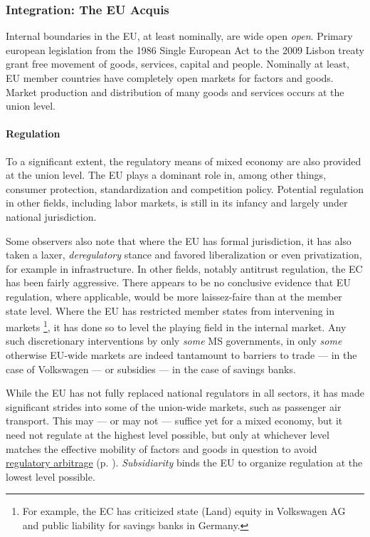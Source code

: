 \documentclass[11pt,a4paper,oneside,openright]{article}
\begin{document}
\subsubsection[Integration]{Integration: The EU Acquis} \label{sec:EU_Acquis}
Internal boundaries in the \gls{EU}, at least nominally, are wide open \emph{open}. %
Primary european legislation from the 1986 Single European Act to the 2009 Lisbon treaty grant free movement of goods, services, capital and people. 
Nominally at least, \gls{EU} member countries have completely open markets for factors and goods. 
Market production and distribution of many goods and services occurs at the union level.

\paragraph{Regulation} To a significant extent, the regulatory means of mixed economy are also provided at the union level. 
The \gls{EU} plays a dominant role in, among other things, consumer protection, standardization and competition policy. 
Potential regulation in other fields, including labor markets, is still in its infancy and largely under national jurisdiction. %

Some observers also note that where the \gls{EU} has formal jurisdiction, it has also taken a laxer, \emph{deregulatory} stance and favored liberalization or even privatization, for example in infrastructure. %
In other fields, notably antitrust regulation, the \gls{EC} has been fairly aggressive. 
There appears to be no conclusive evidence that \gls{EU} regulation, where applicable, would be more laissez-faire than at the member state level. %
Where the \gls{EU} has restricted member states from intervening in markets
	\footnote{
		For example, the \gls{EC} has criticized state (Land) equity in Volkswagen AG and public liability for savings banks in Germany.
	}, 
it has done so to level the playing field in the internal market. 
Any such discretionary interventions by only \emph{some} \gls{MS} governments, in only \emph{some} otherwise \gls{EU}-wide markets are indeed tantamount to barriers to trade --- in the case of Volkswagen --- or subsidies --- in the case of savings banks.  %

While the \gls{EU} has not fully replaced national regulators in all sectors, it has made significant strides into some of the union-wide markets, such as passenger air transport. 
This may --- or may not --- suffice yet for a mixed economy, but it need not regulate at the highest level possible, but only at whichever level matches the effective mobility of factors and goods in question to avoid \hyperref[sec:regulatory]{regulatory arbitrage} (p. \pageref{sec:regulatory}). 
\emph{Subsidiarity} binds the \gls{EU} to organize regulation at the lowest level possible.
\end{document}
